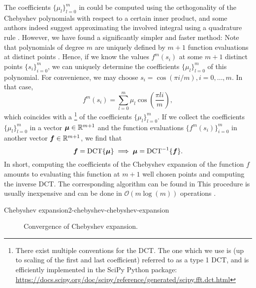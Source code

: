 The coefficients $\{\mu_l\}_{l=0}^m$ in 
could be computed using the orthogonality of the Chebyshev polynomials with respect
to a certain inner product, and some authors indeed suggest approximating the
involved integral using a quadrature rule \cite[algorithm~1]{lin2017randomized}. However, we
have found a significantly simpler and faster method: Note that polynomials of
degree $m$ are uniquely defined by $m+1$ function evaluations at distinct points \cite{gauss1799demonstratio}.
Hence, if we know the values $f^m(s_i)$ at some $m+1$ distinct points 
$\{s_i\}_{i=0}^m$, we can uniquely determine the coefficients $\{\mu_l\}_{l=0}^m$
of this polynomial. For convenience, we may choose $s_i = \cos(\pi i/m), i=0,\dots,m$.
In that case,
\begin{equation}
    f^m(s_i) = \sum_{l=0}^{m} \mu_l \cos\left(\frac{\pi l i}{m}\right),
    \label{equ:2-chebyshev-chebyshev-nodes-evaluation}
\end{equation}
which coincides with a \footnote{There exist multiple conventions for the DCT.
The one which we use is (up to scaling of the first and last coefficient)
referred to as a type 1 DCT, and is efficiently implemented in the SciPy Python package:
\url{https://docs.scipy.org/doc/scipy/reference/generated/scipy.fft.dct.html}} of the coefficients $\{\mu_l\}_{l=0}^m$.
If we collect the coefficients $\{\mu_l\}_{l=0}^{m}$ in a vector $\boldsymbol{\mu} \in \mathbb{R}^{m+1}$ 
and the function evaluations $\{f^m(s_i)\}_{i=0}^{m}$ in another
vector $\boldsymbol{f} \in \mathbb{R}^{m+1}$, we find that
\begin{equation}
    \boldsymbol{f} = \operatorname{DCT} \{ \boldsymbol{\mu} \} \implies \boldsymbol{\mu} = \operatorname{DCT}^{-1}\{ \boldsymbol{f} \}.
    \label{equ:2-chebyshev-chebyshev-DCT}
\end{equation}
In short, computing the coefficients of the Chebyshev expansion 
of the function $f$ amounts to evaluating this function at $m+1$ well
chosen points and computing the inverse \gls{DCT}. The corresponding algorithm
can be found in 
This procedure is usually inexpensive and can be done in $\mathcal{O}(m \log(m))$
operations \cite{makhoul1980fct}.

\begin{algo}{Chebyshev expansion}{2-chebyshev-chebyshev-expansion}
    
\end{algo}

\begin{figure}[ht]
    \centering
    
    \caption{Convergence of Chebyshev expansion.}
    \label{fig:2-chebyshev-chebyshev-convergence}
\end{figure}

